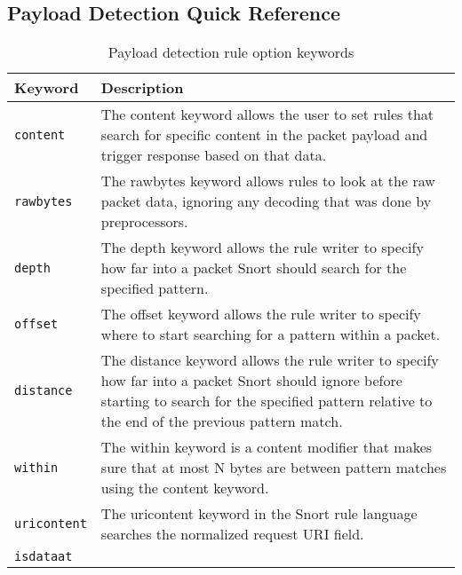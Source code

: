 \documentclass[english]{report}
\begin{document}
\subsection{Payload Detection Quick Reference}
\begin{center}
\begin{longtable}[h]{| p{1in} | p{4.5in} |}
\caption{Payload detection rule option keywords} \\

\hline
Keyword & Description \\
\hline

\hline
\texttt{content} &

The content keyword allows the user to set rules that search for specific
content in the packet payload and trigger response based on that data. \\

\hline
\texttt{rawbytes} &

The rawbytes keyword allows rules to look at the raw packet data, ignoring any
decoding that was done by preprocessors. \\

\hline
\texttt{depth} &

The depth keyword allows the rule writer to specify how far into a packet Snort
should search for the specified pattern. \\

\hline
\texttt{offset} &

The offset keyword allows the rule writer to specify where to start searching
for a pattern within a packet. \\

\hline
\texttt{distance} &

The distance keyword allows the rule writer to specify how far into a packet
Snort should ignore before starting to search for the specified pattern
relative to the end of the previous pattern match. \\

\hline
\texttt{within} &

The within keyword is a content modifier that makes sure that at most N bytes
are between pattern matches using the content keyword. \\

\hline
\texttt{uricontent} &

The uricontent keyword in the Snort rule language searches the normalized
request URI field. \\

\hline
\texttt{isdataat} &


\end{longtable}
\end{center}
\end{document}
